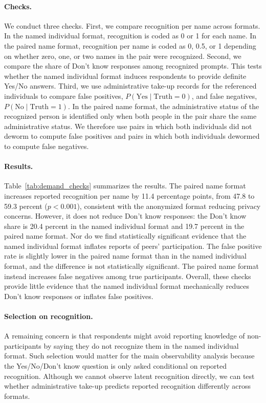 \documentclass[ECM\space ReStud.tex]{subfiles}
\begin{document}
\paragraph{Checks.}
We conduct three checks. First, we compare recognition per name across formats. In the named individual format, recognition is coded as 0 or 1 for each name. In the paired name format, recognition per name is coded as 0, 0.5, or 1 depending on whether zero, one, or two names in the pair were recognized. Second, we compare the share of Don't know responses among recognized prompts. This tests whether the named individual format induces respondents to provide definite Yes/No answers. Third, we use administrative take-up records for the referenced individuals to compare false positives, \(P(\text{Yes}\mid \text{Truth}=0)\), and false negatives, \(P(\text{No}\mid \text{Truth}=1)\). In the paired name format, the administrative status of the recognized person is identified only when both people in the pair share the same administrative status. We therefore use pairs in which both individuals did not deworm to compute false positives and pairs in which both individuals dewormed to compute false negatives.

\paragraph{Results.}
Table~\ref{tab:demand_checks} summarizes the results. The paired name format increases reported recognition per name by 11.4 percentage points, from 47.8 to 59.3 percent (\(p<0.001\)), consistent with the anonymized format reducing privacy concerns. However, it does not reduce Don't know responses: the Don't know share is 20.4 percent in the named individual format and 19.7 percent in the paired name format. Nor do we find statistically significant evidence that the named individual format inflates reports of peers' participation. The false positive rate is slightly lower in the paired name format than in the named individual format, and the difference is not statistically significant. The paired name format instead increases false negatives among true participants. Overall, these checks provide little evidence that the named individual format mechanically reduces Don't know responses or inflates false positives.

\paragraph{Selection on recognition.}
A remaining concern is that respondents might avoid reporting knowledge of non-participants by saying they do not recognize them in the named individual format. Such selection would matter for the main observability analysis because the Yes/No/Don't know question is only asked conditional on reported recognition. Although we cannot observe latent recognition directly, we can test whether administrative take-up predicts reported recognition differently across formats.
\end{document}
